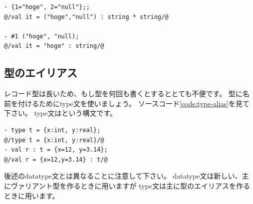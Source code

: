 \documentclass[11pt,a4paper]{article}
\begin{document}
\begin{lstlisting}[caption=タプルはレコード,label=code:tuple-is-record]
- {1="hoge", 2="null"};;
@/val it = ("hoge","null") : string * string/@

- #1 ("hoge", "null);
@/val it = "hoge" : string/@
\end{lstlisting}

\subsection{型のエイリアス}

レコード型は長いため、もし型を何回も書くとするととても不便です。
型に名前を付けるためにtype文を使いましょう。
ソースコード\ref{code:type-alias}を見て下さい。
type文はという構文です。

\begin{lstlisting}[caption=型のエイリアス,label=code:type-alias]
- type t = {x:int, y:real};
@/type t = {x:int, y:real}/@
- val r : t = {x=12, y=3.14};
@/val r = {x=12,y=3.14} : t/@
\end{lstlisting}

後述のdatatype文とは異なることに注意して下さい。
datatype文は新しい、主にヴァリアント型を作るときに用いますが
type文は主に型のエイリアスを作るときに用います。
\end{document}
